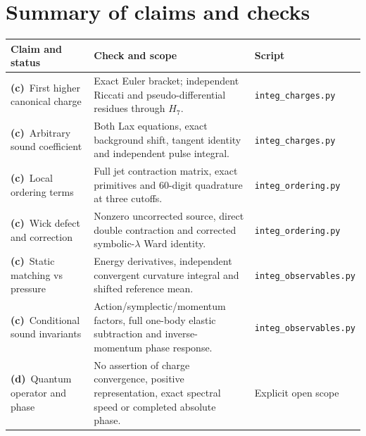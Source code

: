 \documentclass[11pt,a4paper]{article}
\newcommand{\C}{\textbf{(c)}\ }
\newcommand{\D}{\textbf{(d)}\ }
\newcommand{\file}[1]{\nolinkurl{#1}}
\newcommand{\chg}{\file{integ_charges.py}}
\newcommand{\ord}{\file{integ_ordering.py}}
\newcommand{\obs}{\file{integ_observables.py}}
\begin{document}
\section{Summary of claims and checks}
\small
\begin{longtable}{@{}L{4.6cm}L{6.2cm}L{4.3cm}@{}}
\toprule Claim and status & Check and scope & Script\\\midrule\endhead
\C First higher canonical charge & Exact Euler bracket; independent
Riccati and pseudo-differential residues through $H_7$. & \chg\\
\C Arbitrary sound coefficient & Both Lax equations, exact background
shift, tangent identity and independent pulse integral. & \chg\\
\C Local ordering terms & Full jet contraction matrix, exact primitives
and 60-digit quadrature at three cutoffs. & \ord\\
\C Wick defect and correction & Nonzero uncorrected source, direct double
contraction and corrected symbolic-$\lambda$ Ward identity. & \ord\\
\C Static matching vs pressure & Energy derivatives, independent convergent
curvature integral and shifted reference mean. & \obs\\
\C Conditional sound invariants & Action/symplectic/momentum factors,
full one-body elastic subtraction and inverse-momentum phase response. & \obs\\
\D Quantum operator and phase & No assertion of charge convergence,
positive representation, exact spectral speed or completed absolute phase.
& Explicit open scope\\\bottomrule
\end{longtable}
\normalsize
\end{document}
